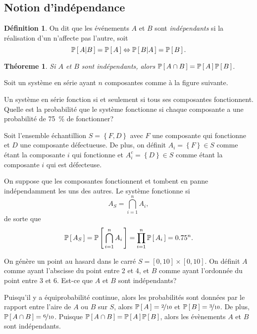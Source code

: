 \documentclass[11pt]{article}
\makeatletter
\renewcommand\P[1]{%
	\ensuremath{%
		\mathbb{P}\left[\,#1\,\right]%
	}%
}%
\newcommand\Pg[2]{%
	\ensuremath{%
		\mathbb{P}\left[\,#1\middle\rvert#2\,\right]%
	}%
}%
\newtheorem{theoreme}{Théoreme}[section]
\theoremstyle{remark}
\theoremstyle{definition}
\newtheorem*{@definition}{Définition}
\newenvironment{definition}{%
	\begin{@definition}%
}{%
	\end{@definition}%
	\setcounter{property}{0}%
}
\makeatother
\begin{document}
\subsection{Notion d'indépendance}
\begin{definition}
	On dit que les événements $A$ et $B$ sont \textit{indépendants} si la
	réalisation d'un n'affecte pas l'autre, soit
	\begin{equation*}
		\Pg{A}{B}=\P{A}\Leftrightarrow
		\Pg{B}{A}=\P{B}.
	\end{equation*}
\end{definition}

\begin{theoreme}
	Si $A$ et $B$ sont indépendants, alors $\P{A\cap B}=\P{A}\P{B}$.
\end{theoreme}

\begin{exemple}
	Soit un système en série ayant $n$ composantes comme à la figure suivante.
	\begin{figure}[H]
		\centering
		
	\end{figure}
	Un système en série fonction si et seulement si tous ses composantes
	fonctionnent. Quelle est la probabilité que le système fonctionne si chaque
	composante a une probabilité de \SI{75}{\percent} de fonctionner?

	Soit l'ensemble échantillion $S=\left\{F,D\right\}$ avec $F$ une composante
	qui fonctionne et $D$ une composante défectueuse. De plus, on définit
	$A_i=\left\{F\right\}\in S$ comme étant la composante $i$ qui fonctionne et
	$A_i^c=\left\{D\right\}\in S$ comme étant la composante $i$ qui est
	défecteuse.

	On suppose que les composantes fonctionnent et tombent en panne
	indépendamment les uns des autres. Le système fonctionne si
	\begin{equation*}
		A_S=\bigcap_{i=1}^nA_i,
	\end{equation*}
	de sorte que
	\begin{equation*}
		\P{A_S}
		=\P{\bigcap_{i=1}^nA_i}
		=\prod_{i=1}^n\P{A_i}
		=\SI{0.75}{}^n.
	\end{equation*}
\end{exemple}

\begin{exemple}
	On génère un point au hasard dans le carré $S=[0,10]\times[0,10]$. On
	définit $A$ comme ayant l'abscisse du point entre 2 et 4, et $B$ comme
	ayant l'ordonnée du point entre 3 et 6. Est-ce que $A$ et $B$ sont
	indépendants?
	\begin{figure}[H]
		\centering
		
		\vspace{-3mm}
	\end{figure}
	Puisqu'il y a équiprobabilité continue, alors les probabilités sont données
	par le rapport entre l'aire de $A$ ou $B$ sur $S$, alors
	$\P{A}=\nicefrac{2}{10}$ et $\P{B}=\nicefrac{3}{10}$. De plus,
	$\P{A\cap B}=\nicefrac{6}{10}$. Puisque $\P{A\cap B}=\P{A}\P{B}$, alors les
	évènements $A$ et $B$ sont indépendants.
\end{exemple}
\end{document}
